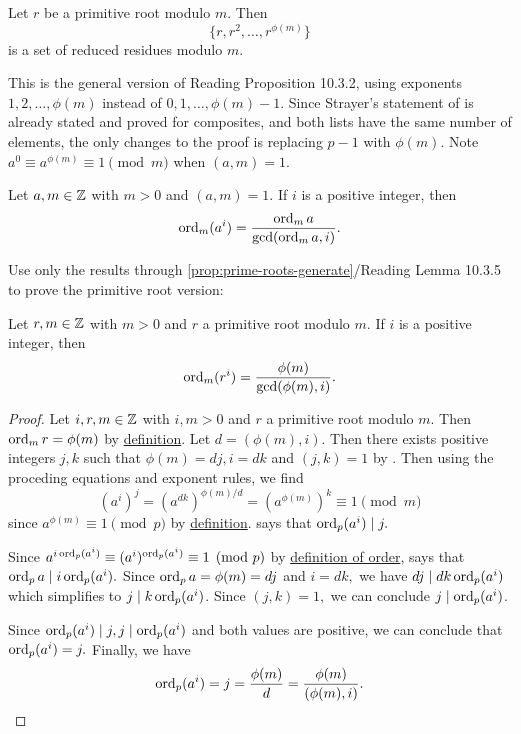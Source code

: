 \documentclass{ximera}
\begin{document}
\begin{proposition}\label{prop:prime-roots-generate}
    Let $r$ be a primitive root modulo $m.$ Then \[\{r,r^2,\dots,r^{\phi(m)}\}\]
    is a set of reduced residues modulo $m.$
\end{proposition}
This is the general version of Reading Proposition 10.3.2, using exponents $1,2,\dots,\phi(m)$ instead of $0,1,\dots,\phi(m)-1$. Since Strayer's statement of  is already stated and proved for composites, and both lists have the same number of elements, the only changes to the proof is replacing $p-1$ with $\phi(m).$ Note $a^0\equiv a^{\phi(m)}\equiv 1\pmod{m}$ when $(a,m)=1.$


\begin{proposition}\label{prop:compare-order}
    Let $a,m\in\mathbb Z$ with $m>0$ and $(a,m)=1.$ If $i$ is a positive integer, then 
    \[\operatorname{ord}_m(a^i)=\frac{\operatorname{ord}_m a}{\gcd(\operatorname{ord}_m a,i)}.\]
\end{proposition}

\begin{br}
    Use only the results through \cref{prop:prime-roots-generate}/Reading Lemma 10.3.5 to prove the primitive root version:


    \begin{proposition}
        Let $r,m\in\mathbb Z$ with $m>0$ and $r$ a primitive root modulo $m.$
        If $i$ is a positive integer, then 
    \[\operatorname{ord}_m(r^i)=\frac{\phi(m)}{\gcd(\phi(m),i)}.\]
    
    \begin{proof}
        Let $i,r,m\in\mathbb Z$ with $i,m\gt 0$ and $r$ a primitive root modulo $m.$ Then $\operatorname{ord}_m r=\phi(m)$ by \hyperref[defn:prime-root]{definition}. Let $d=(\phi(m),i).$ Then there exists positive integers $j,k$ such that $\phi(m)=dj,i=dk$ and $(j,k)=1$ by . Then using the proceding equations and exponent rules, we find
            \[
                (a^i)^j=(a^{dk})^{\phi(m)/d}=(a^{\phi(m)})^k\equiv 1\pmod{m}
            \]
        since $a^{\phi(m)}\equiv 1\pmod{p}$ by \hyperref[defn:primeRoot]{definition}.  says that $\operatorname{ord}_p(a^i)\mid j.$

        Since $a^{i\operatorname{ord}_p(a^i)}\equiv(a^i)^{\operatorname{ord}_p(a^i)}\equiv 1\pmod{p}$ by \hyperref[defn:order]{definition of order},  says that $\operatorname{ord}_p a\mid i \operatorname{ord}_p(a^i).$ Since $\operatorname{ord}_p a=\phi(m)=dj$ and $i=dk,$ we have $dj\mid dk \operatorname{ord}_p(a^i)$ which simplifies to $j\mid k \operatorname{ord}_p(a^i)$. Since $(j,k)=1,$ we can conclude $j\mid \operatorname{ord}_p(a^i)$. 

        Since $\operatorname{ord}_p(a^i)\mid j, j\mid \operatorname{ord}_p(a^i)$ and both values are positive, we can conclude that $\operatorname{ord}_p(a^i)=j.$ Finally, we have 
            \[
                \operatorname{ord}_p(a^i)=j=\frac{\phi(m)}{d}=\frac{\phi(m)}{(\phi(m),i)}.
            \]
    \end{proof}
\end{proposition}
\end{br}
\end{document}
